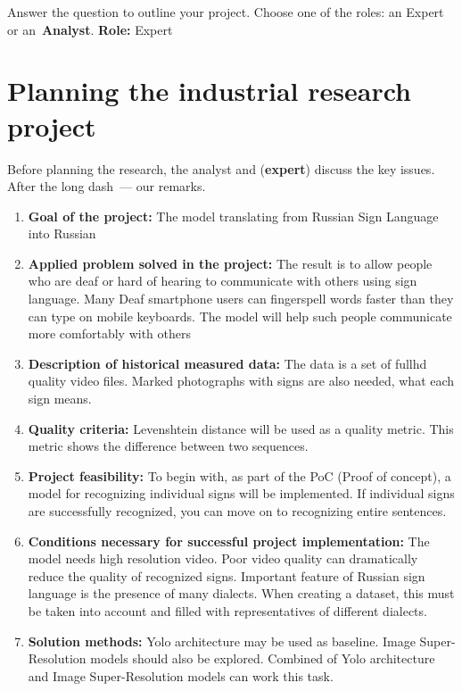 \documentclass[12pt]{article}
\date{}
\begin{document}
\maketitle

Answer the question to outline your project. Choose one of the roles: an {Expert} or an~\textbf{Analyst}. \textbf{Role:} Expert


\section{Planning the industrial research project}
Before planning the research, the analyst and (\textbf{expert}) discuss the key issues. After the long dash~--- our remarks.

\begin{enumerate}
\item \textbf{Goal of the project:} The model translating from Russian Sign Language into Russian
\item \textbf{Applied problem solved in the project:} The result is to allow people who are deaf or hard of hearing to communicate with others using sign language.
Many Deaf smartphone users can fingerspell words faster than they can type on mobile keyboards. The model will help 
such people communicate more comfortably with others
\item \textbf{Description of historical measured data:} The data is a set of fullhd quality video files. 
Marked photographs with signs are also needed, what each sign means. 
\item \textbf{Quality criteria:} Levenshtein distance will be used as a quality metric. This metric shows the difference between two sequences.
\item \textbf{Project feasibility:} To begin with, as part of the PoC (Proof of concept), a model for recognizing individual signs 
will be implemented. If individual signs are successfully recognized, you can move on to recognizing entire sentences. 
\item \textbf{Conditions necessary for successful project implementation:} The model needs high resolution video. 
Poor video quality can dramatically reduce the quality of recognized signs. Important feature of Russian sign language is the presence of many dialects.
When creating a dataset, this must be taken into account and filled with representatives of different dialects. 
\item \textbf{Solution methods:} Yolo architecture may be used as baseline. Image Super-Resolution models should also be explored. Combined of Yolo architecture 
and Image Super-Resolution models can work this task. 
\end{enumerate}
\end{document}
